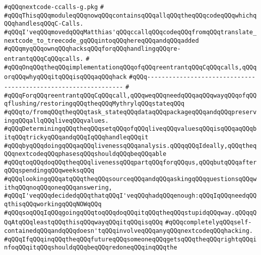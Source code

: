 \label{src/lib/compiler/back/low/main/nextcode/nextcode-ccalls-g.pkg}
\verb|#qQQqnextcode-ccalls-g.pkg|\newline
\verb|#|\newline
\verb|#qQQqThisqQQqmoduleqQQqnowqQQqcontainsqQQqallqQQqtheqQQqcodeqQQqwhichqQQqhandlesqQQqC-Calls.|\newline
\verb|#qQQqI'veqQQqmovedqQQqMatthias'qQQqccallqQQqcodeqQQqfromqQQqtranslate_nextcode_to_treecode_gqQQqintoqQQqhereqQQqandqQQqadded|\newline
\verb|#qQQqmyqQQqownqQQqhacksqQQqforqQQqhandlingqQQqre-entrantqQQqCqQQqcalls.|\newline
\verb|#|\newline
\verb|#qQQqOnqQQqtheqQQqimplementationqQQqofqQQqreentrantqQQqCqQQqcalls,qQQqorqQQqwhyqQQqitqQQqisqQQqaqQQqhack|\newline
\verb|#qQQq---------------------------------------------------------------|\newline
\verb|#|\newline
\verb|#qQQqForqQQqreentrantqQQqCqQQqcall,qQQqweqQQqneedqQQqaqQQqwayqQQqofqQQqflushing/restoringqQQqtheqQQqMythrylqQQqstateqQQq|\newline
\verb|#qQQqto/fromqQQqtheqQQqtask_stateqQQqdataqQQqpackageqQQqandqQQqpreservingqQQqallqQQqliveqQQqvalues.|\newline
\verb|#qQQqDeterminingqQQqtheqQQqsetqQQqofqQQqliveqQQqvaluesqQQqisqQQqaqQQqbitqQQqtrickyqQQqandqQQqIqQQqhandleqQQqit|\newline
\verb|#qQQqbyqQQqdoingqQQqaqQQqlivenessqQQqanalysis.qQQqqQQqIdeally,qQQqtheqQQqnextcodeqQQqphasesqQQqshouldqQQqbeqQQqable|\newline
\verb|#qQQqtoqQQqdoqQQqtheqQQqlivenessqQQqpartqQQqforqQQqus,qQQqbutqQQqafterqQQqspendingqQQqweeksqQQq|\newline
\verb|#qQQqlookingqQQqatqQQqtheqQQqsourceqQQqandqQQqaskingqQQqquestionsqQQqwithqQQqnoqQQqoneqQQqanswering,|\newline
\verb|#qQQqI'veqQQqdecidedqQQqthatqQQqI'veqQQqhadqQQqenough:qQQqIqQQqneedqQQqthisqQQqworkingqQQqNOWqQQq|\newline
\verb|#qQQqsoqQQqIqQQqgoingqQQqtoqQQqdoqQQqitqQQqtheqQQqstupidqQQqway.qQQqqQQqAtqQQqleastqQQqthisqQQqwayqQQqitqQQqisqQQq|\newline
\verb|#qQQqcompletelyqQQqself-containedqQQqandqQQqdoesn'tqQQqinvolveqQQqanyqQQqnextcodeqQQqhacking.|\newline
\verb|#qQQqIfqQQqinqQQqtheqQQqfutureqQQqsomeoneqQQqgetsqQQqtheqQQqrightqQQqinfoqQQqitqQQqshouldqQQqbeqQQqredoneqQQqinqQQqthe|\newline
